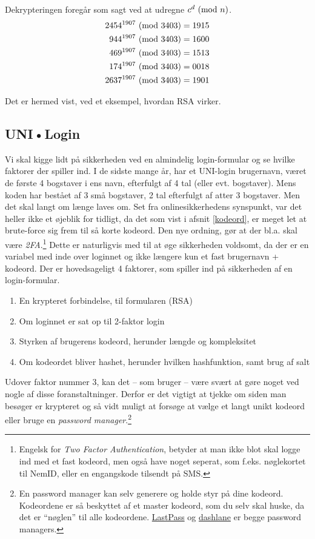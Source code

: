 Dekrypteringen foregår som sagt ved at udregne \(c^d \ (\mathrm{mod}\ n)\).
\begin{align*}
    2454^{1907} \ (\mathrm{mod}\ 3403) &= 1915\\
    944^{1907} \ (\mathrm{mod}\ 3403)  &= 1600\\
    469^{1907} \ (\mathrm{mod}\ 3403)  &= 1513\\
    174^{1907} \ (\mathrm{mod}\ 3403)  &= 0018\\
    2637^{1907} \ (\mathrm{mod}\ 3403) &= 1901
\end{align*}

Det er hermed vist, ved et eksempel, hvordan RSA virker.



\subsection{UNI•Login}
Vi skal kigge lidt på sikkerheden ved en almindelig login-formular og se hvilke faktorer der spiller ind.
I de sidste mange år, har et UNI-login brugernavn, været de første 4 bogstaver i ens navn, efterfulgt af 4 tal (eller evt. bogstaver).
Mens koden har bestået af 3 små bogstaver, 2 tal efterfulgt af atter 3 bogstaver.
Men det skal langt om længe laves om. \cite{unilogin}
Set fra onlinesikkerhedens synspunkt, var det heller ikke et øjeblik for tidligt, da det som vist i afsnit \ref{kodeord}, er meget let at brute-force sig frem til så korte kodeord.
Den nye ordning, gør at der bl.a. skal være \emph{2FA}.\footnote{Engelsk for \emph{Two Factor Authentication}, betyder at man ikke blot skal logge ind med et fast kodeord, men også have noget seperat, som f.eks. nøglekortet til NemID, eller en engangskode tilsendt på SMS.}
Dette er naturligvis med til at øge sikkerheden voldsomt, da der er en variabel med inde over loginnet og ikke længere kun et fast brugernavn + kodeord.
Der er hovedsageligt 4 faktorer, som spiller ind på sikkerheden af en login-formular.

\begin{enumerate}[noitemsep]
    \item En krypteret forbindelse, til formularen (RSA)
    \item Om loginnet er sat op til 2-faktor login
    \item Styrken af brugerens kodeord, herunder længde og kompleksitet
    \item Om kodeordet bliver hashet, herunder hvilken hashfunktion, samt brug af salt
\end{enumerate}


Udover faktor nummer 3, kan det -- som bruger -- være svært at gøre noget ved nogle af disse foranstaltninger.
Derfor er det vigtigt at tjekke om siden man besøger er krypteret og så vidt muligt at forsøge at vælge et langt unikt kodeord eller bruge en \emph{password manager}.\footnote{En password manager kan selv generere og holde styr på dine kodeord. Kodeordene er så beskyttet af et master kodeord, som du selv skal huske, da det er ``nøglen'' til alle kodeordene. \href{https://www.lastpass.com/}{LastPass} og \href{https://www.dashlane.com/}{dashlane} er begge password managers.}

